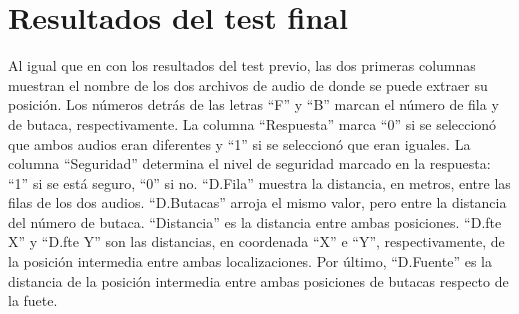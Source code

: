 \documentclass[11pt,a4paper]{book}
\begin{document}
\section{Resultados del test final}
    Al igual que en con los resultados del test previo, las dos primeras columnas muestran el nombre de los dos archivos de audio de donde se puede extraer su posición. Los números detrás de las letras ``F'' y ``B'' marcan el número de fila y de butaca, respectivamente. La columna ``Respuesta'' marca ``0'' si se seleccionó que ambos audios eran diferentes y ``1'' si se seleccionó que eran iguales. La columna ``Seguridad'' determina el nivel de seguridad marcado en la respuesta: ``1'' si se está seguro, ``0'' si no. ``D.Fila'' muestra la distancia, en metros, entre las filas de los dos audios. ``D.Butacas'' arroja el mismo valor, pero entre la distancia del número de butaca. ``Distancia'' es la distancia entre ambas posiciones. ``D.fte X'' y ``D.fte Y'' son las distancias, en coordenada ``X'' e ``Y'', respectivamente,  de la posición intermedia entre ambas localizaciones. Por último, ``D.Fuente'' es la distancia de la posición intermedia entre ambas posiciones de butacas respecto de la fuete.
    \scriptsize
\end{document}
